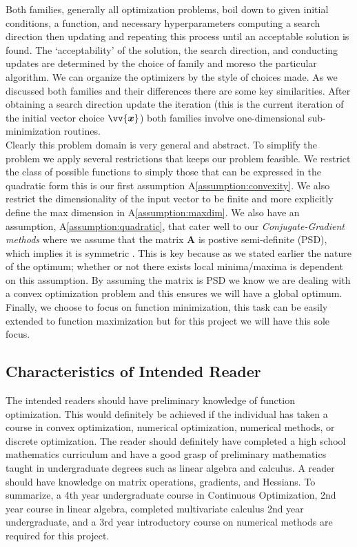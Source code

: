 \documentclass[12pt]{article}
\begin{document}
Both families, generally all optimization problems, boil down to given initial conditions, a function, and necessary hyperparameters computing a search direction then updating and repeating this process until an acceptable solution is found. The `acceptability' of the solution, the search direction, and conducting updates are determined by the choice of family and moreso the particular algorithm. We can organize the optimizers by the style of choices made. As we discussed both families and their differences there are some key similarities. After obtaining a search direction update the iteration (this is the current iteration of the initial vector choice $\vv{\bm{x}}$) both families involve one-dimensional sub-minimization routines. 
\\

Clearly this problem domain is very general and abstract. To simplify the problem we apply several restrictions that keeps our problem feasible. We restrict the class of possible functions to simply those that can be expressed in the quadratic form this is our first assumption A\ref{assumption:convexity}. We also restrict the dimensionality of the input vector to be finite and more explicitly define the max dimension in A\ref{assumption:maxdim}. We also have an assumption, A\ref{assumption:quadratic}, that cater well to our \textit{Conjugate-Gradient methods} where we assume that the matrix $\mathbf{A}$ is postive semi-definite (PSD), which implies it is symmetric \citep{Boyd2005ConvexO}. This is key because as we stated earlier the nature of the optimum; whether or not there exists local minima/maxima is dependent on this assumption. By assuming the matrix is PSD we know we are dealing with a convex optimization problem and this ensures we will have a global optimum. Finally, we choose to focus on function minimization, this task can be easily extended to function maximization but for this project we will have this sole focus.







\subsection{Characteristics of Intended Reader} \label{sec_IntendedReader}
The intended readers should have preliminary knowledge of function optimization. This would definitely be achieved if the individual has taken a course in convex optimization, numerical optimization, numerical methods, or discrete optimization. The reader should definitely have completed a high school mathematics curriculum and have a good grasp of preliminary mathematics taught in undergraduate degrees such as linear algebra and calculus. A reader should have knowledge on matrix operations, gradients, and Hessians. To summarize, a 4th year undergraduate course in Continuous Optimization, 2nd year course in linear algebra, completed multivariate calculus 2nd year undergraduate, and a 3rd year introductory course on numerical methods are required for this project.
\\
\end{document}
